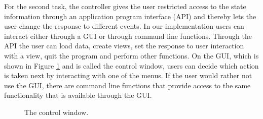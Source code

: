 \documentclass{article}[11pt]
\begin{document}
For the second task, the controller gives the user restricted access
to the state information through an application program interface
(API) and thereby lets the user change the response to different events. 
In our implementation users can interact either through a GUI
or through command line functions.  Through the API the user can load
data, create views, set the response to user interaction with a view,
quit the program and perform other functions.  On the GUI, which is shown in
Figure \ref{Fig:ContWin} and is called the control window, users can decide
which action is taken next by interacting with one of the menus.  If the user
would rather not use the GUI, there are command line functions that
provide access to the same functionality that is available through the
GUI.  

\begin{figure}[ht]
  \begin{center}
    \caption{ The control window. }
    \label{Fig:ContWin}
  \end{center}
\end{figure}
\end{document}
